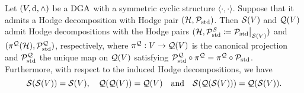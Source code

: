 \documentclass[\MainFolder/Text.tex]{subfiles}
\begin{document}
\begin{Proposition}\label{Prop:PropPropertiessd}
Let $(V,\mathrm{d},\wedge)$ be a $\mathrm{DGA}$ with a symmetric cyclic structure $\langle\cdot,\cdot\rangle$. Suppose that it admits a Hodge decomposition with Hodge pair $(\mathcal{H},\mathcal{P}_{\mathrm{std}})$. Then $\mathcal{S}(V)$ and $\mathcal{Q}(V)$ admit Hodge decompositions with the Hodge pairs $(\Harm,\HtpStd^\VansSmall\coloneqq\Restr{\HtpStd}{\VansSmall(V)})$ and $(\pi^{\mathcal{Q}}(\mathcal{H}),\mathcal{P}_{\mathrm{std}}^{\mathcal{Q}})$, respectively, where $\pi^{\mathcal{Q}}: V \rightarrow \mathcal{Q}(V)$ is the canonical projection and $\mathcal{P}_{\mathrm{std}}^{\mathcal{Q}}$ the unique map on $\mathcal{Q}(V)$ satisfying $\mathcal{P}_{\mathrm{std}}^{\mathcal{Q}} \circ \pi^{\mathcal{Q}}=\pi^{\mathcal{Q}}\circ \mathcal{P}_{\mathrm{std}}$. Furthermore, with respect to the induced Hodge decompositions, we have
\begin{equation}\label{Eq:QSRelations}
\mathcal{S}(\mathcal{S}(V)) = \mathcal{S}(V), \quad \mathcal{Q}(\mathcal{Q}(V)) = \mathcal{Q}(V)\quad\text{and}\quad \mathcal{S}(\mathcal{Q}(\mathcal{S}(V))) = \mathcal{Q}(\mathcal{S}(V)).\end{equation}
\end{Proposition}
\end{document}
